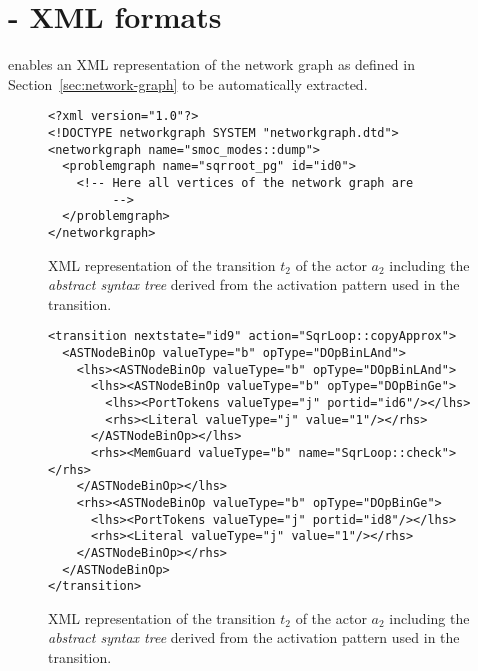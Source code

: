 \chapter{\SysteMoC{} - XML formats}\label{sec:systemoc-ngx}

\SysteMoC{} enables an XML representation of the network graph as defined in Section~\ref{sec:network-graph} to be automatically extracted.

%

\begin{figure}[t]
\begin{verbatim}
<?xml version="1.0"?>
<!DOCTYPE networkgraph SYSTEM "networkgraph.dtd">
<networkgraph name="smoc_modes::dump">
  <problemgraph name="sqrroot_pg" id="id0">
    <!-- Here all vertices of the network graph are
         -->
  </problemgraph>
</networkgraph>
\end{verbatim}
\caption{\label{fig:ngx-skeleton}%
XML representation of the transition $t_2$ of the  actor $a_2$ including the \emph{abstract syntax tree} derived from the activation pattern used in the transition.
}
\end{figure}

\begin{figure}[t]
\begin{verbatim}
<transition nextstate="id9" action="SqrLoop::copyApprox">
  <ASTNodeBinOp valueType="b" opType="DOpBinLAnd">
    <lhs><ASTNodeBinOp valueType="b" opType="DOpBinLAnd">
      <lhs><ASTNodeBinOp valueType="b" opType="DOpBinGe">
        <lhs><PortTokens valueType="j" portid="id6"/></lhs>
        <rhs><Literal valueType="j" value="1"/></rhs>
      </ASTNodeBinOp></lhs>
      <rhs><MemGuard valueType="b" name="SqrLoop::check"></rhs>
    </ASTNodeBinOp></lhs>
    <rhs><ASTNodeBinOp valueType="b" opType="DOpBinGe">
      <lhs><PortTokens valueType="j" portid="id8"/></lhs>
      <rhs><Literal valueType="j" value="1"/></rhs>
    </ASTNodeBinOp></rhs>
  </ASTNodeBinOp>
</transition>
\end{verbatim}
\caption{\label{fig:xml-t2-sqrloop}%
XML representation of the transition $t_2$ of the  actor $a_2$ including the \emph{abstract syntax tree} derived from the activation pattern used in the transition.
}
\end{figure}
